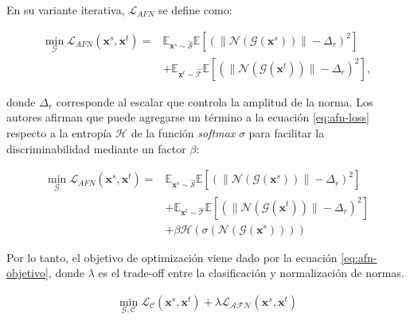 En su variante iterativa, $\mathcal{L}_{AFN}$ se define como:

\begin{align}
  \min_{\mathcal{G}} \mathcal{L}_{AFN}(\mathbf{x}^s, \mathbf{x}^t) = & \mathbb{E}_{\mathbf{x}^s \sim \mathcal{\hat{S}}} \mathbb{E}[(\| \mathcal{N}(\mathcal{G}(\mathbf{x}^s)) \| - \Delta_r)^2] \nonumber \\
                                                                     & + \mathbb{E}_{\mathbf{x}^t \sim \mathcal{\hat{T}}} \mathbb{E}[(\| \mathcal{N}(\mathcal{G}(\mathbf{x}^t)) \| - \Delta_r)^2],
  \label{eq:afn-loss}
\end{align}

\noindent
donde $\Delta_r$ corresponde al escalar que controla la amplitud de la norma. Los autores afirman que puede agregarse
un término a la ecuación \ref{eq:afn-loss} respecto a la entropía $\mathcal{H}$ de la función {\it softmax} $\sigma$
para facilitar la discriminabilidad mediante un factor $\beta$:

\begin{align}
  \min_{\mathcal{G}} \mathcal{L}_{AFN}(\mathbf{x}^s, \mathbf{x}^t) = & \mathbb{E}_{\mathbf{x}^s \sim \mathcal{\hat{S}}} \mathbb{E}[(\| \mathcal{N}(\mathcal{G}(\mathbf{x}^s)) \| - \Delta_r)^2] \nonumber   \\
                                                                     & + \mathbb{E}_{\mathbf{x}^t \sim \mathcal{\hat{T}}} \mathbb{E}[(\| \mathcal{N}(\mathcal{G}(\mathbf{x}^t)) \| - \Delta_r)^2] \nonumber \\
                                                                     & + \beta \mathcal{H}(\sigma(\mathcal{N}(\mathcal{G}(\mathbf{x}^s)) ))
  \label{eq:afn-loss-entropy}
\end{align}

Por lo tanto, el objetivo de optimización viene dado por la ecuación \ref{eq:afn-objetivo}, donde $\lambda$ es el
trade-off entre la clasificación y normalización de normas.

\begin{align}
  \min_{\mathcal{G}, \mathcal{C}} \mathcal{L}_{\mathcal{C}}(\mathbf{x}^s, \mathbf{x}^t) + \lambda \mathcal{L}_{\mathcal{AFN}}(\mathbf{x}^s, \mathbf{x}^t)
  \label{eq:afn-objetivo}
\end{align}
